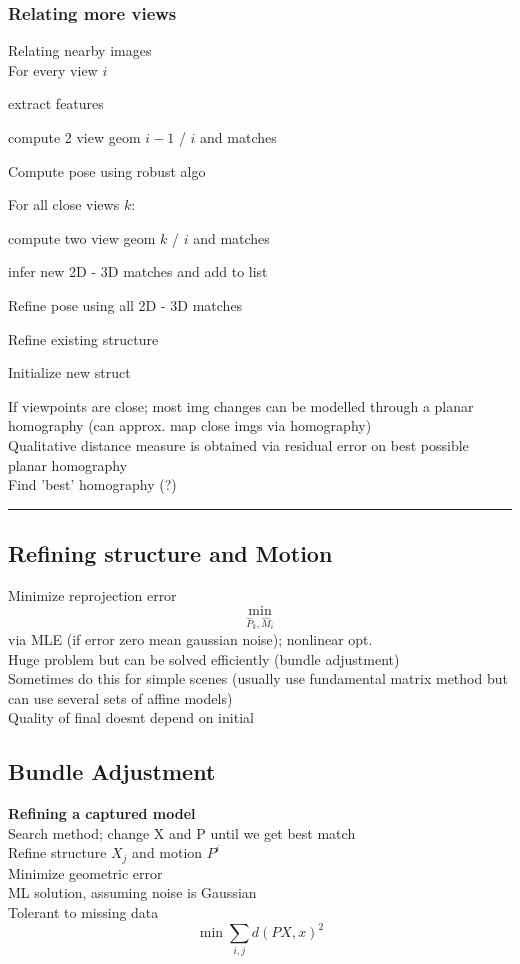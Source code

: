 \documentclass{article}
\begin{document}
\subsubsection{Relating more views}
Relating nearby images
\\
For every view $i$
\begin{list}{}{}
  \item extract features
  \item compute 2 view geom $i-1$ / $i$ and matches 
  \item Compute pose using robust algo
  \item For all close views $k$:
  \item \begin{list}{}{}
    \item compute two view geom $k$ / $i$ and matches
    \item infer new 2D - 3D matches and add to list 
  \end{list}
  \item Refine pose using all 2D - 3D matches
  \item Refine existing structure
  \item Initialize new struct
\end{list}
If viewpoints are close; most img changes can be modelled through a planar homography
(can approx. map close imgs via homography)
\\
Qualitative distance measure is obtained via residual error on best possible planar
homography 
\\
Find 'best' homography (?)

\noindent\rule{\textwidth}{0.2pt}

\subsection{Refining structure and Motion}
Minimize reprojection error
\[
  \min_{\hat P_k, \hat M_i}
\]
via MLE (if error zero mean gaussian noise); nonlinear opt.
\\
Huge problem but can be solved efficiently (bundle adjustment)
\\
Sometimes do this for simple scenes 
(usually use fundamental matrix method but can use several sets of affine models)
\\
Quality of final doesnt depend on initial


\subsection{Bundle Adjustment}
\textbf{Refining a captured model}
\\
Search method; change X and P until we get best match
\\
Refine structure $X_j$ and motion $P^i$ 
\\
Minimize geometric error
\\
ML solution, assuming noise is Gaussian
\\
Tolerant to missing data 
\[
  \min \sum_{i,j} d(PX, x)^2
\]
\end{document}
